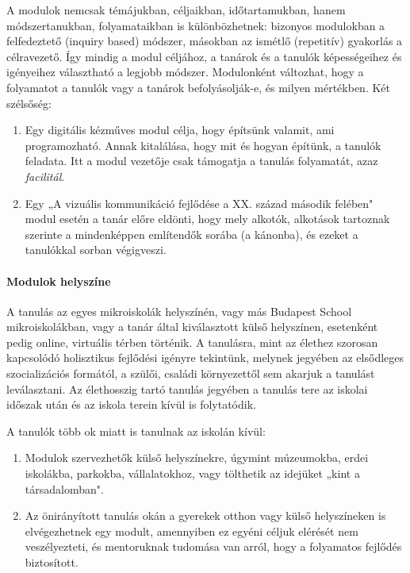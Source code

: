 A modulok nemcsak témájukban, céljaikban, időtartamukban, hanem
módszertanukban, folyamataikban is különbözhetnek: bizonyos modulokban a
felfedeztető (inquiry based) módszer, másokban az ismétlő (repetitív) gyakorlás
a célravezető. Így mindig a modul céljához, a tanárok és a tanulók
képességeihez és igényeihez választható a legjobb módszer. Modulonként
változhat, hogy a folyamatot a tanulók vagy a tanárok befolyásolják-e, és
milyen mértékben. Két szélsőség:
\begin{enumerate}
  \item Egy digitális kézműves modul célja, hogy építsünk valamit, ami
        programozható. Annak kitalálása, hogy mit és hogyan építünk, a tanulók
        feladata. Itt a modul vezetője csak támogatja a tanulás folyamatát, azaz
        \emph{facilitál}.

  \item Egy „A vizuális kommunikáció fejlődése a XX. század második felében"
        modul esetén a tanár előre eldönti, hogy mely alkotók, alkotások tartoznak
        szerinte a mindenképpen említendők sorába (a kánonba), és ezeket a tanulókkal
        sorban végigveszi.
\end{enumerate}

\paragraph {Modulok helyszíne}

A tanulás az egyes mikroiskolák helyszínén, vagy más Budapest School
mikroiskolákban, vagy a tanár által kiválasztott külső helyszínen, esetenként
pedig online, virtuális térben történik. A tanulásra, mint az élethez szorosan
kapcsolódó holisztikus fejlődési igényre tekintünk, melynek jegyében az
elsődleges szocializációs formától, a szülői, családi környezettől sem akarjuk
a tanulást leválasztani. Az élethosszig tartó tanulás jegyében a tanulás tere
az iskolai időszak után és az iskola terein kívül is folytatódik.

A tanulók több ok miatt is tanulnak az iskolán kívül:
\begin{enumerate}
  \item Modulok szervezhetők külső helyszínekre, úgymint múzeumokba, erdei
        iskolákba, parkokba, vállalatokhoz, vagy tölthetik az idejüket „kint a
        társadalomban".

  \item Az önirányított tanulás okán a gyerekek otthon vagy külső helyszíneken is
        elvégezhetnek egy modult, amennyiben ez egyéni céljuk elérését nem
        veszélyezteti, és mentoruknak tudomása van arról, hogy a folyamatos fejlődés
        biztosított.
\end{enumerate}

